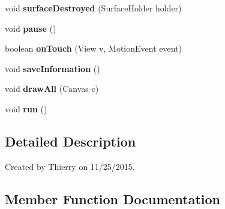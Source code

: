 \begin{DoxyCompactItemize}
\item 
void {\bfseries surface\+Destroyed} (Surface\+Holder holder)\hypertarget{classcom_1_1initi_1_1thierry_1_1colormatchapp__v02_1_1_game_surface_a633b7d6234d5ce5feb78c5f0751a7cf8}{}\label{classcom_1_1initi_1_1thierry_1_1colormatchapp__v02_1_1_game_surface_a633b7d6234d5ce5feb78c5f0751a7cf8}

\item 
void {\bfseries pause} ()\hypertarget{classcom_1_1initi_1_1thierry_1_1colormatchapp__v02_1_1_game_surface_a501331bb0b325c076046a01043f660b8}{}\label{classcom_1_1initi_1_1thierry_1_1colormatchapp__v02_1_1_game_surface_a501331bb0b325c076046a01043f660b8}

\item 
boolean {\bfseries on\+Touch} (View v, Motion\+Event event)\hypertarget{classcom_1_1initi_1_1thierry_1_1colormatchapp__v02_1_1_game_surface_afce37a3716f84ddf234ef7b9dbc895a9}{}\label{classcom_1_1initi_1_1thierry_1_1colormatchapp__v02_1_1_game_surface_afce37a3716f84ddf234ef7b9dbc895a9}

\item 
void {\bfseries save\+Information} ()\hypertarget{classcom_1_1initi_1_1thierry_1_1colormatchapp__v02_1_1_game_surface_adff33b9c2ae913f01bb569c35dda14d7}{}\label{classcom_1_1initi_1_1thierry_1_1colormatchapp__v02_1_1_game_surface_adff33b9c2ae913f01bb569c35dda14d7}

\item 
void {\bfseries draw\+All} (Canvas c)\hypertarget{classcom_1_1initi_1_1thierry_1_1colormatchapp__v02_1_1_game_surface_a5b04a210d9697090c3b31ea7a25ebb10}{}\label{classcom_1_1initi_1_1thierry_1_1colormatchapp__v02_1_1_game_surface_a5b04a210d9697090c3b31ea7a25ebb10}

\item 
void {\bfseries run} ()\hypertarget{classcom_1_1initi_1_1thierry_1_1colormatchapp__v02_1_1_game_surface_a3dd15ceec75d03e7e9af5d7160d6b71a}{}\label{classcom_1_1initi_1_1thierry_1_1colormatchapp__v02_1_1_game_surface_a3dd15ceec75d03e7e9af5d7160d6b71a}

\end{DoxyCompactItemize}


\subsection{Detailed Description}
Created by Thierry on 11/25/2015. 

\subsection{Member Function Documentation}
